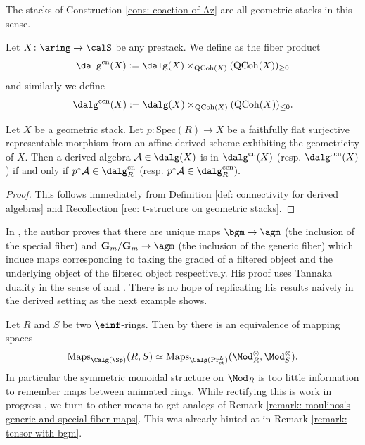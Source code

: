 \documentclass[10pt,reqno]{amsart}
\numberwithin{equation}{section}
\newcommand{\cA}{{\mathcal{A}}}
\newcommand{\G}{\mathbf{G}}
\newcommand{\spec}{{\mathrm{Spec}}}
\newcommand{\Maps}{\mathrm{Maps}}
\newcommand{\Qcoh}{\mathrm{QCoh}}
\newcommand{\st}{\mathrm{st}}
\newcommand{\cn}{\mathrm{cn}}
\newcommand{\ccn}{\mathrm{ccn}}
\begin{document}
\begin{remark}\label{remark: stacks of filtered are all geometric}
    The stacks of Construction \ref{cons: coaction of Az} are all geometric stacks in this sense.
\end{remark}

\begin{definition}\label{def: connectivity for derived algebras}
    Let $X\colon \aring\to \calS$ be any prestack. We define  as the fiber product $$\dalg^\cn(X):=\dalg(X)\times_{\Qcoh(X)}(\Qcoh(X))_{\geq 0}$$ and similarly we define 
    $$\dalg^\ccn(X):=\dalg(X)\times_{\Qcoh(X)}(\Qcoh(X))_{\leq 0}.$$
\end{definition}


\begin{proposition}\label{prop: texactness of derived algebras}
    Let $X$ be a geometric stack. Let $p\colon \spec(R)\to X$ be a faithfully flat surjective representable morphism from an affine derived scheme exhibiting the geometricity of $X.$ Then a derived algebra $\cA\in \dalg(X)$ is in $\dalg^\cn(X)$ (resp. $\dalg^\ccn(X)$) if and only if $p^*\cA\in \dalg_R^\cn$ (resp. $p^*\cA\in \dalg_R^\ccn).$ 
\end{proposition}

\begin{proof}
    This follows immediately from Definition \ref{def: connectivity for derived algebras} and Recollection \ref{rec: t-structure on geometric stacks}.
\end{proof}


\begin{remark}\label{remark: moulinos's generic and special fiber maps}
    In \cite[\S~6]{Moulinos2021GeometryOfFiltrations}, the author proves that there are unique maps $\bgm\to \agm$ (the inclusion of the special fiber) and $\G_m/\G_m\to \agm$ (the inclusion of the generic fiber) which induce maps corresponding to taking the graded of a filtered object and the underlying object of the filtered object respectively. His proof uses Tannaka duality in the sense of \cite{Lurie2011DAGVIII} and \cite{BhattHalpernLeistner2017TannakaRevisited}. 
    There is no hope of replicating his results naively in the derived setting as the next example shows.
\end{remark}

\begin{example}\label{example: no derived tannaka}
Let $R$ and $S$ be two $\einf$-rings. Then by \cite[Proposition 7.1.2.7]{HA} there is an equivalence of mapping spaces 
$$\Maps_{\Calg(\Sp)}(R,S)\simeq \Maps_{\Calg(\Pr^L_{\st})}(\Mod^\otimes_R,\Mod_S^{\otimes}).$$
In particular the symmetric monoidal structure on $\Mod_R$ is too little information to remember maps between animated rings. While rectifying this is work in progress \cite{MundingerSahai_inprep}, we turn to other means to get analogs of Remark \ref{remark: moulinos's generic and special fiber maps}. This was already hinted at in Remark \ref{remark: tensor with bgm}.
\end{example}
\end{document}
